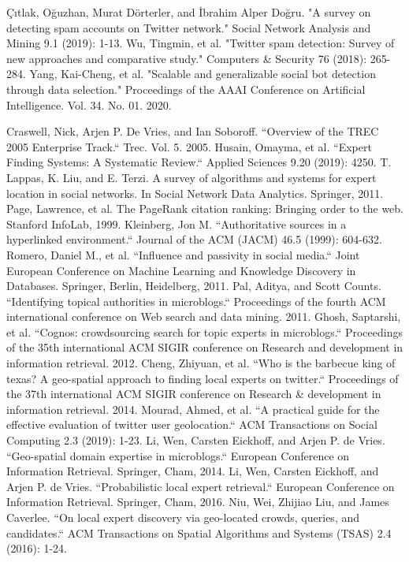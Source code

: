 \begin{thebibliography}{200}
 Çıtlak, Oğuzhan, Murat Dörterler, and İbrahim Alper Doğru. "A survey on detecting spam accounts on Twitter network." Social Network Analysis and Mining 9.1 (2019): 1-13.\label{appendix:bookCh2.1}
 Wu, Tingmin, et al. "Twitter spam detection: Survey of new approaches and comparative study." Computers \& Security 76 (2018): 265-284.\label{appendix:bookCh2.2}
 Yang, Kai-Cheng, et al. "Scalable and generalizable social bot detection through data selection." Proceedings of the AAAI Conference on Artificial Intelligence. Vol. 34. No. 01. 2020.\label{appendix:bookCh2.3}

 Craswell, Nick, Arjen P. De Vries, and Ian Soboroff. ``Overview of the TREC 2005 Enterprise Track.`` Trec. Vol. 5. 2005.\label{appendix:bookCh2}
 Husain, Omayma, et al. ``Expert Finding Systems: A Systematic Review.`` Applied Sciences 9.20 (2019): 4250.\label{appendix:bookCh3}
 T. Lappas, K. Liu, and E. Terzi. A survey of algorithms and systems for expert location in social networks. In Social Network Data Analytics. Springer, 2011.\label{appendix:bookCh4}
 Page, Lawrence, et al. The PageRank citation ranking: Bringing order to the web. Stanford InfoLab, 1999.\label{appendix:bookCh5}
 Kleinberg, Jon M. ``Authoritative sources in a hyperlinked environment.`` Journal of the ACM (JACM) 46.5 (1999): 604-632.\label{appendix:bookCh6}
 Romero, Daniel M., et al. ``Influence and passivity in social media.`` Joint European Conference on Machine Learning and Knowledge Discovery in Databases. Springer, Berlin, Heidelberg, 2011.\label{appendix:bookCh8}
 Pal, Aditya, and Scott Counts. ``Identifying topical authorities in microblogs.`` Proceedings of the fourth ACM international conference on Web search and data mining. 2011. \label{appendix:bookCh9}
 Ghosh, Saptarshi, et al. ``Cognos: crowdsourcing search for topic experts in microblogs.`` Proceedings of the 35th international ACM SIGIR conference on Research and development in information retrieval. 2012.\label{appendix:bookCh10}
 Cheng, Zhiyuan, et al. ``Who is the barbecue king of texas? A geo-spatial approach to finding local experts on twitter.`` Proceedings of the 37th international ACM SIGIR conference on Research {\&} development in information retrieval. 2014.\label{appendix:bookCh11}
 Mourad, Ahmed, et al. ``A practical guide for the effective evaluation of twitter user geolocation.`` ACM Transactions on Social Computing 2.3 (2019): 1-23.
\label{appendix:bookCh13}
 Li, Wen, Carsten Eickhoff, and Arjen P. de Vries. ``Geo-spatial domain expertise in microblogs.`` European Conference on Information Retrieval. Springer, Cham, 2014.
\label{appendix:bookCh15}
 Li, Wen, Carsten Eickhoff, and Arjen P. de Vries. ``Probabilistic local expert retrieval.`` European Conference on Information Retrieval. Springer, Cham, 2016.\label{appendix:bookCh16}
 Niu, Wei, Zhijiao Liu, and James Caverlee. ``On local expert discovery via geo-located crowds, queries, and candidates.`` ACM Transactions on Spatial Algorithms and Systems (TSAS) 2.4 (2016): 1-24.\label{appendix:bookCh17}


\end{thebibliography}
